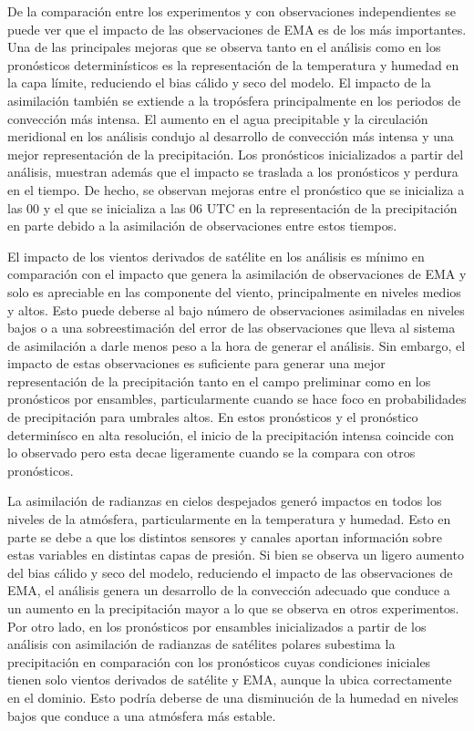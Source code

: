 \documentclass[12pt,oneside,a4paper]{reedthesis}
\begin{document}
De la comparación entre los experimentos y con observaciones independientes se puede ver que el impacto de las observaciones de EMA es de los más importantes. Una de las principales mejoras que se observa tanto en el análisis como en los pronósticos determinísticos es la representación de la temperatura y humedad en la capa límite, reduciendo el bias cálido y seco del modelo. El impacto de la asimilación también se extiende a la tropósfera principalmente en los periodos de convección más intensa. El aumento en el agua precipitable y la circulación meridional en los análisis condujo al desarrollo de convección más intensa y una mejor representación de la precipitación. Los pronósticos inicializados a partir del análisis, muestran además que el impacto se traslada a los pronósticos y perdura en el tiempo. De hecho, se observan mejoras entre el pronóstico que se inicializa a las 00 y el que se inicializa a las 06 UTC en la representación de la precipitación en parte debido a la asimilación de observaciones entre estos tiempos.

El impacto de los vientos derivados de satélite en los análisis es mínimo en comparación con el impacto que genera la asimilación de observaciones de EMA y solo es apreciable en las componente del viento, principalmente en niveles medios y altos. Esto puede deberse al bajo número de observaciones asimiladas en niveles bajos o a una sobreestimación del error de las observaciones que lleva al sistema de asimilación a darle menos peso a la hora de generar el análisis. Sin embargo, el impacto de estas observaciones es suficiente para generar una mejor representación de la precipitación tanto en el campo preliminar como en los pronósticos por ensambles, particularmente cuando se hace foco en probabilidades de precipitación para umbrales altos. En estos pronósticos y el pronóstico determinísco en alta resolución, el inicio de la precipitación intensa coincide con lo observado pero esta decae ligeramente cuando se la compara con otros pronósticos.

La asimilación de radianzas en cielos despejados generó impactos en todos los niveles de la atmósfera, particularmente en la temperatura y humedad. Esto en parte se debe a que los distintos sensores y canales aportan información sobre estas variables en distintas capas de presión. Si bien se observa un ligero aumento del bias cálido y seco del modelo, reduciendo el impacto de las observaciones de EMA, el análisis genera un desarrollo de la convección adecuado que conduce a un aumento en la precipitación mayor a lo que se observa en otros experimentos. Por otro lado, en los pronósticos por ensambles inicializados a partir de los análisis con asimilación de radianzas de satélites polares subestima la precipitación en comparación con los pronósticos cuyas condiciones iniciales tienen solo vientos derivados de satélite y EMA, aunque la ubica correctamente en el dominio. Esto podría deberse de una disminución de la humedad en niveles bajos que conduce a una atmósfera más estable.
\end{document}
